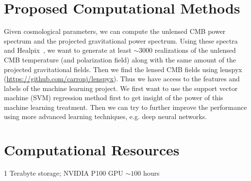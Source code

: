 \documentclass[12pt]{article}
\begin{document}
\begin{small}
\section{Proposed Computational Methods}
Given cosmological parameters, we can compute the unlensed CMB power spectrum and the projected gravitational power spectrum. Using these spectra and Healpix~\cite{Gorski:2004by}, we want to generate at least $\sim 3000$ realizations of the unlensed CMB temperature (and polarization field) along with the same amount of the projected gravitational fields. Then we find the lensed CMB fields using lenspyx (\url{https://github.com/carronj/lenspyx}). Thus we have access to the features and labels of the machine learning project. We first want to use the support vector machine (SVM) regression method first to get insight of the power of this machine learning treatment. Then we can try to further improve the performance using more advanced learning techniques, e.g. deep neural networks.

\section{Computational Resources}
1 Terabyte storage;  NVIDIA P100 GPU $\sim 100$ hours

\end{small}


\end{document}
